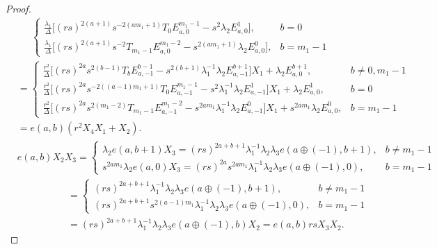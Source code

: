 \documentclass[10pt,a4paper]{amsart}
\begin{document}
\begin{proof}
\begin{align*}
\begin{cases}
\displaystyle\frac{\lambda_1}{\Delta} \Bigg[ 
            (rs)^{2(a+1)} s^{-2 (a m_1+1)}  T_0 
           E^{m_1-1}_{a,0} - s^{2}  \lambda_2 E^{1}_{a,0}  
        \Bigg],  
        &  b = 0 \\[15pt]
\displaystyle\frac{\lambda_1}{\Delta} \Bigg[ 
            (rs)^{2(a+1)} s^{-2} T_{m_1-1} E^{m_1-2}_{a,0}- s^{2(am_1+1)}\lambda_2 E^{0}_{a,0}  
        \Bigg],  
        & b = m_1 - 1
\end{cases}\end{align*}
\begin{align*}
    &=\begin{cases}
        \displaystyle \frac{r^2}{\Delta} \Bigg[ 
            (rs)^{2a} s^{2(b-1)}T_b  
            E^{b-1}_{a,-1}- s^{2(b+1)} \lambda_1^{-1} \lambda_2 E^{b+1}_{a,-1}
        \Bigg]X_1 +\lambda_2E^{b+1}_{a,0},  
        &  b \neq 0, m_1 - 1 \\[15pt]
\displaystyle\frac{r^2}{\Delta} \Bigg[ 
            (rs)^{2a} s^{-2( (a-1) m_1+1)} T_0  E^{m_1-1}_{a,-1}
            - s^{2} \lambda_1^{-1} \lambda_2 E^{1}_{a,-1}
        \Bigg]X_1+\lambda_2E^{1}_{a,0},  
        &  b = 0 \\[15pt]
\displaystyle\frac{r^2}{\Delta} \Bigg[ 
            (rs)^{2a} s^{2(m_1 - 2)} T_{m_1-1} 
           E^{m_1-2}_{a,-1} - s^{2 a m_1} \lambda_1^{-1} \lambda_2 E^{0}_{a,-1} 
        \Bigg]X_1 +s^{2am_1}\lambda_2E^{0}_{a,0},  
        & b = m_1 - 1
    \end{cases}\\[3pt]
    &= e(a,b)(r^2X_4X_1+X_2).\\
     &e(a,b)X_2X_3 = 
    \begin{cases}
        \lambda_2 e(a,b+1)X_3=(rs)^{2a+b+1}\lambda_1^{-1}\lambda_2\lambda_3e(a\oplus(-1),b+1), & b \neq m_1 - 1 \\[3pt]
        s^{2 a m_1} \lambda_2 e(a,0)X_3=(rs)^{2a}s^{2am_1}\lambda_1^{-1}\lambda_2\lambda_3e(a\oplus(-1),0), & b = m_1 - 1
        \end{cases} \\[3pt]
        &\quad \quad \quad \quad \quad \,= 
    \begin{cases}(rs)^{2a+b+1}\lambda_1^{-1}\lambda_2\lambda_3e(a\oplus(-1),b+1), & b \neq m_1 - 1 \\[3pt]
       (rs)^{2a+b+1}s^{2(a-1)m_1}\lambda_1^{-1}\lambda_2\lambda_3e(a\oplus(-1),0), & b = m_1 - 1
        \end{cases}\\[3pt]
        &\quad \quad \quad \quad \quad \,=(rs)^{2a+b+1}\lambda_1^{-1}\lambda_2\lambda_3e(a\oplus(-1),b)X_2=e(a,b)rsX_3X_2.

\end{align*}
\end{proof}
\end{document}
